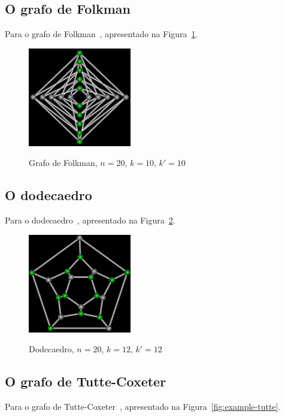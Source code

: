 \subsection{O grafo de Folkman}
Para o grafo de Folkman~\cite{cite:example-folkman},
apresentado na Figura~\ref{fig:example-folkman}.

\begin{figure}[htb]
\centering
\includegraphics[width=0.4\textwidth]{img/folkman.png}
\label{fig:example-folkman}
\caption{Grafo de Folkman, $n=20$, $k=10$, $k'=10$}
\end{figure}


\subsection{O dodecaedro}
Para o dodecaedro~\cite{cite:example-plato},
apresentado na Figura~\ref{fig:example-dodecaedro}.

\begin{figure}[htb]
\centering
\includegraphics[width=0.4\textwidth]{img/dodecaedro.png}
\label{fig:example-dodecaedro}
\caption{Dodecaedro, $n=20$, $k=12$, $k'=12$}
\end{figure}

\subsection{O grafo de Tutte-Coxeter}
Para o grafo de Tutte-Coxeter~\cite{cite:example-tutte},
apresentado na Figura~\ref{fig:example-tutte}.

